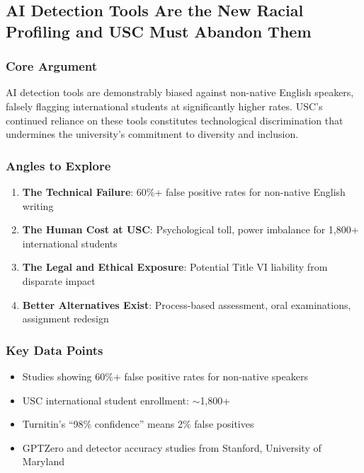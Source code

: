 \documentclass[11pt,letterpaper]{article}
\begin{document}
\newpage
\subsection{AI Detection Tools Are the New Racial Profiling and USC Must Abandon Them}

\subsubsection*{Core Argument}
AI detection tools are demonstrably biased against non-native English speakers, falsely flagging international students at significantly higher rates. USC's continued reliance on these tools constitutes technological discrimination that undermines the university's commitment to diversity and inclusion.

\subsubsection*{Angles to Explore}
\begin{enumerate}[noitemsep]
    \item \textbf{The Technical Failure}: 60\%+ false positive rates for non-native English writing
    \item \textbf{The Human Cost at USC}: Psychological toll, power imbalance for 1,800+ international students
    \item \textbf{The Legal and Ethical Exposure}: Potential Title VI liability from disparate impact
    \item \textbf{Better Alternatives Exist}: Process-based assessment, oral examinations, assignment redesign
\end{enumerate}

\subsubsection*{Key Data Points}
\begin{itemize}[noitemsep]
    \item Studies showing 60\%+ false positive rates for non-native speakers
    \item USC international student enrollment: $\sim$1,800+
    \item Turnitin's ``98\% confidence'' means 2\% false positives
    \item GPTZero and detector accuracy studies from Stanford, University of Maryland
\end{itemize}
\end{document}
